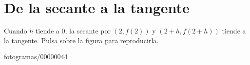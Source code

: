 \documentclass[11pt]{article}
\begin{document}
\section{De la secante a la tangente}

Cuando $h$ tiende a 0, la secante por $(2,f(2))$ y $(2+h,f(2+h))$
tiende a la tangente. Pulsa sobre la figura para reproducirla.

\begin{center}
    {fotogramas/}{0000}{0044}
\end{center}
\end{document}

